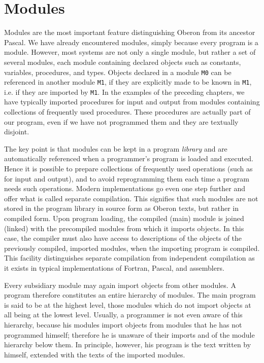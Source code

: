 \chapter{Modules}
\label{ch:mod}
Modules are the most important feature distinguishing Oberon from its ancestor Pascal. We have
already encountered modules, simply because every program is a module. However, most systems
are not only a single module, but rather a set of several modules, each module containing declared
objects such as constants, variables, procedures, and types. Objects declared in a module \verb|M0|
can be referenced in another module \verb|M1|, if they are explicitly made to be known in \verb|M1|,
i.e. if they are imported by \verb|M1|. In the examples of the preceding chapters, we have typically
imported procedures for input and output from modules containing collections of frequently used
procedures. These procedures are actually part of our program, even if we have not programmed them
and they are textually disjoint.

The key point is that modules can be kept in a program \emph{library} and are automatically
referenced when a programmer's program is loaded and executed. Hence it is possible to prepare
collections of frequently used operations (such as for input and output), and to avoid
reprogramming them each time a program needs such operations. Modern implementations go even
one step further and offer what is called separate compilation. This signifies that such modules
are not stored in the program library in source form as Oberon texts, but rather in compiled
form. Upon program loading, the compiled (main) module is joined (linked) with the precompiled
modules from which it imports objects. In this case, the compiler must also have access to
descriptions of the objects of the previously compiled, imported modules, when the importing
program is compiled. This facility distinguishes separate compilation from independent
compilation as it exists in typical implementations of Fortran, Pascal, and assemblers.

Every subsidiary module may again import objects from other modules. A program therefore
constitutes an entire hierarchy of modules. The main program is said to be at the highest level,
those modules which do not import objects at all being at the lowest level. Usually, a programmer is
not even aware of this hierarchy, because his modules import objects from modules that he has not
programmed himself; therefore he is unaware of their imports and of the module hierarchy below
them. In principle, however, his program is the text written by himself, extended with the texts of the
imported modules.

